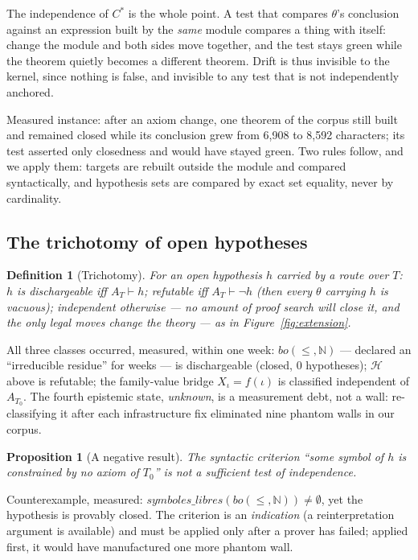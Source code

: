 \documentclass[11pt]{article}
\newtheorem{definition}{Definition}
\newtheorem{proposition}{Proposition}
\theoremstyle{remark}\newtheorem{example}{Example}
\begin{document}
The independence of $C^\ast$ is the whole point. A test that compares $\theta$'s
conclusion against an expression built by the \emph{same} module compares a thing with
itself: change the module and both sides move together, and the test stays green while
the theorem quietly becomes a different theorem. Drift is thus invisible to the kernel,
since nothing is false, and invisible to any test that is not independently anchored.

Measured instance: after an axiom change, one theorem of the corpus still built and
remained closed while its conclusion grew from 6{,}908 to 8{,}592 characters; its test
asserted only closedness and would have stayed green. Two rules follow, and we apply
them: targets are rebuilt outside the module and compared syntactically, and
hypothesis sets are compared by exact set equality, never by cardinality.

\subsection{The trichotomy of open hypotheses}
\label{sec:trichotomy}
\begin{definition}[Trichotomy]
For an open hypothesis $h$ carried by a route over $T$:
$h$ is \emph{dischargeable} iff $A_T \vdash h$;
\emph{refutable} iff $A_T \vdash \neg h$ (then every $\theta$ carrying $h$ is vacuous);
\emph{independent} otherwise --- no amount of proof search will close it, and the only
legal moves change the theory --- as in Figure~\ref{fig:extension}.
\end{definition}

All three classes occurred, measured, within one week: $bo(\le,\mathbb{N})$ ---
declared an ``irreducible residue'' for weeks --- is dischargeable (closed, 0
hypotheses); $\mathcal{H}$ above is refutable; the family-value bridge $X_\iota =
f(\iota)$ is classified independent of $A_{T_0}$. The fourth epistemic state,
\emph{unknown}, is a measurement debt, not a wall: re-classifying it after each
infrastructure fix eliminated nine phantom walls in our corpus.

\begin{proposition}[A negative result]
The syntactic criterion ``some symbol of $h$ is constrained by no axiom of $T_0$'' is
\emph{not} a sufficient test of independence.
\end{proposition}
Counterexample, measured: $\mathit{symboles\_libres}(bo(\le,\mathbb{N})) \neq
\emptyset$, yet the hypothesis is provably closed. The criterion is an \emph{indication}
(a reinterpretation argument is available) and must be applied only after a prover has
failed; applied first, it would have manufactured one more phantom wall.
\end{document}
